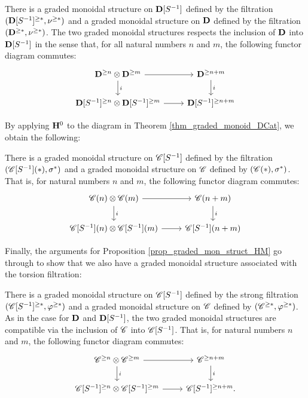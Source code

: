 \begin{thm}\label{thm_graded_monoid_DCat}
There is a graded monoidal structure on $\DCatLoc{S}$ defined by
the filtration $(\Prerad{*}{\DCatLoc{S}}, \preradD{*})$ and a 
graded monoidal structure on $\DCat$ defined by the filtration
$(\Prerad{*}{\DCat}, \preradD{*})$. The two graded monoidal 
structures respects the inclusion of $\DCat$ into $\DCatLoc{S}$ in 
the sense that, for all natural numbers $n$ and $m$, the following 
functor diagram commutes:
\[
\begin{tikzcd}
\Prerad{n}{\DCat} \tensor \Prerad{m}{\DCat} \arrow{r} \arrow{d}{i} &
\Prerad{n + m}{\DCat} \arrow{d}{i} \\
\Prerad{n}{\DCatLoc{S}} \tensor \Prerad{m}{\DCatLoc{S}} \arrow{r} &
\Prerad{n + m}{\DCatLoc{S}}
\end{tikzcd}
\]
\end{thm}

By applying $\HH^0$ to the diagram in Theorem \ref{thm_graded_monoid_DCat},
we obtain the following:

\begin{cor}
There is a graded monoidal structure on $\CatLoc{C}{S}$ defined
by the filtration $(\SGFilt{*}{\CatLoc{C}{S}}, \sgHI{*})$ and a graded 
monoidal structure on $\Cat{C}$ defined by $(\SGFilt{*}{\Cat{C}}, 
\sgHI{*})$. That is, for natural numbers $n$ and $m$, the 
following functor diagram commutes:
\[
\begin{tikzcd}
\SGFilt{n}{\Cat{C}} \tensor \SGFilt{m}{\Cat{C}} \arrow{r} \arrow{d}{i} &
\SGFilt{n + m}{\Cat{C}} \arrow{d}{i} \\
\SGFilt{n}{\CatLoc{C}{S}} \tensor \SGFilt{m}{\CatLoc{C}{S}} \arrow{r} &
\SGFilt{n + m}{\CatLoc{C}{S}}
\end{tikzcd}
\]
\end{cor}

Finally, the arguments for Proposition \ref{prop_graded_mon_struct_HM} go 
through to show that we also have a graded monoidal structure 
associated with the torsion filtration:

\begin{thm}
There is a graded monoidal structure on $\CatLoc{C}{S}$ defined
by the strong filtration $(\Prerad{*}{\CatLoc{C}{S}}, \prerad{*})$ 
and a graded monoidal structure on $\Cat{C}$ defined by 
$(\Prerad{*}{\Cat{C}}, \prerad{*})$. As in the case for $\DCat$ and 
$\DCatLoc{S}$, the two graded monoidal structures are compatible 
via the inclusion of $\Cat{C}$ into $\CatLoc{C}{S}$. That is, for 
natural numbers $n$ and $m$, the following functor diagram 
commutes:
\[
\begin{tikzcd}
\Prerad{n}{\Cat{C}} \tensor \Prerad{m}{\Cat{C}} \arrow{r} \arrow{d}{i} &
\Prerad{n + m}{\Cat{C}} \arrow{d}{i} \\
\Prerad{n}{\CatLoc{C}{S}} \tensor \Prerad{m}{\CatLoc{C}{S}} \arrow{r} &
\Prerad{n + m}{\CatLoc{C}{S}}.
\end{tikzcd}
\]
\end{thm}
